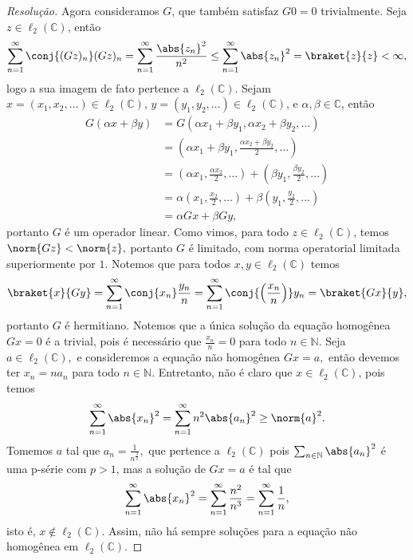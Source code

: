 \begin{proof}[Resolução]
   Agora consideramos \(G\), que também satisfaz \(G0 = 0\) trivialmente. Seja \(z \in \ell_2(\mathbb{C})\), então
   \begin{equation*}
      \sum_{n = 1}^{\infty} \conj{(Gz)_n} (Gz)_n = \sum_{n = 1}^{\infty} \frac{\abs{z_{n}}^2}{n^2} \leq \sum_{n = 1}^\infty \abs{z_n}^2 = \braket{z}{z} < \infty,
   \end{equation*}
   logo a sua imagem de fato pertence a \(\ell_2(\mathbb{C})\). Sejam \(x = (x_1, x_2, \dots) \in \ell_2(\mathbb{C})\), \(y = (y_1, y_2, \dots) \in \ell_2(\mathbb{C})\), e \(\alpha, \beta \in \mathbb{C}\), então
   \begin{align*}
      G(\alpha x + \beta y) &= G \left(\alpha x_1 + \beta y_1, \alpha x_2 + \beta y_2, \dots\right)\\
                            &= \left(\alpha x_1 + \beta y_1, \frac{\alpha x_2 + \beta y_2}{2}, \dots\right)\\
                            &= (\alpha x_1, \frac{\alpha x_2}{2}, \dots) + (\beta y_1, \frac{\beta y_2}{2}, \dots)\\
                            &= \alpha (x_1, \frac{x_2}{2}, \dots) + \beta (y_1, \frac{y_2}{2}, \dots)\\
                            &= \alpha Gx + \beta Gy,
   \end{align*}
   portanto \(G\) é um operador linear. Como vimos, para todo \(z \in \ell_2(\mathbb{C})\), temos \(\norm{Gz} < \norm{z},\) portanto \(G\) é limitado, com norma operatorial limitada superiormente por \(1\). Notemos que para todos \(x,y \in \ell_2(\mathbb{C})\) temos
   \begin{equation*}
      \braket{x}{Gy} = \sum_{n = 1}^\infty \conj{x_n}\frac{y_n}{n} = \sum_{n=1}^\infty \conj{\left(\frac{x_n}{n}\right)}y_n = \braket{Gx}{y},
   \end{equation*}
   portanto \(G\) é hermitiano. Notemos que a única solução da equação homogênea \(Gx = 0\) é a trivial, pois é necessário que \(\frac{x_n}{n} = 0\) para todo \(n \in \mathbb{N}\). Seja \(a \in \ell_2(\mathbb{C}),\) e consideremos a equação não homogênea \(Gx = a,\) então devemos ter \(x_n = n a_{n}\) para todo \(n \in \mathbb{N}\). Entretanto, não é claro que \(x \in \ell_2(\mathbb{C})\), pois temos
   \begin{equation*}
      \sum_{n = 1}^\infty \abs{x_n}^2 = \sum_{n = 1}^\infty n^2 \abs{a_n}^2 \geq \norm{a}^2.
   \end{equation*}
   Tomemos \(a\) tal que \(a_n = \frac{1}{n^{\frac32}},\) que pertence a \(\ell_2(\mathbb{C})\) pois \(\sum_{n \in \mathbb{N}} \abs{a_n}^2\) é uma p-série com \(p > 1\), mas a solução de \(Gx = a\) é tal que
   \begin{equation*}
      \sum_{n = 1}^\infty \abs{x_n}^2 = \sum_{n = 1}^\infty \frac{n^2}{n^3} = \sum_{n = 1}^\infty \frac1n,
   \end{equation*}
   isto é, \(x \notin \ell_2(\mathbb{C})\). Assim, não há sempre soluções para a equação não homogênea em \(\ell_2(\mathbb{C}).\)
\end{proof}
